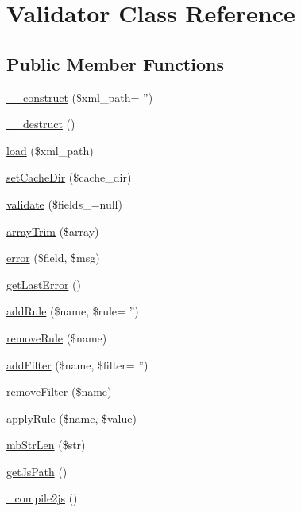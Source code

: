 \hypertarget{classValidator}{\section{Validator Class Reference}
\label{classValidator}
}
\subsection*{Public Member Functions}
\begin{DoxyCompactItemize}
\item 
\hyperlink{classValidator_abfd7a6c58dc8cedae5bef76325b7bf6e}{\-\_\-\-\_\-construct} (\$xml\-\_\-path= '')
\item 
\hyperlink{classValidator_aa076d09e847e8461281d4912688a9388}{\-\_\-\-\_\-destruct} ()
\item 
\hyperlink{classValidator_a43de0eb69cae01eee855f825324ffc39}{load} (\$xml\-\_\-path)
\item 
\hyperlink{classValidator_a1630131530dca60428e72dd4dd2d4af3}{set\-Cache\-Dir} (\$cache\-\_\-dir)
\item 
\hyperlink{classValidator_a05e34dac507b8d719e7f95f2cd0220bc}{validate} (\$fields\-\_\-=null)
\item 
\hyperlink{classValidator_ac4be365554a620a921f6846e80d76671}{array\-Trim} (\$array)
\item 
\hyperlink{classValidator_ad46fa003b320d64ef656b22de870782c}{error} (\$field, \$msg)
\item 
\hyperlink{classValidator_a3de1a1112e46b42ab6a89a4a13048504}{get\-Last\-Error} ()
\item 
\hyperlink{classValidator_a71cc158b6b3f52f03e1ddb34f4801906}{add\-Rule} (\$name, \$rule= '')
\item 
\hyperlink{classValidator_acc2d2fd527f54e1fed839a927a83c6b8}{remove\-Rule} (\$name)
\item 
\hyperlink{classValidator_a5f22a8ddf58df13376769ed422492e33}{add\-Filter} (\$name, \$filter= '')
\item 
\hyperlink{classValidator_a7613a0d6b468b5d5ade046a801b260db}{remove\-Filter} (\$name)
\item 
\hyperlink{classValidator_a8a8be8c74216e9d0ebbd99eb1e29b8d2}{apply\-Rule} (\$name, \$value)
\item 
\hyperlink{classValidator_a46de77869676b1b027a076c2106653e2}{mb\-Str\-Len} (\$str)
\item 
\hyperlink{classValidator_ae9037d1911390583a1358b25c03768e3}{get\-Js\-Path} ()
\item 
\hyperlink{classValidator_ae7b44a7a2bfb3ee4672b4cf2cdbd059f}{\-\_\-compile2js} ()
\end{DoxyCompactItemize}
